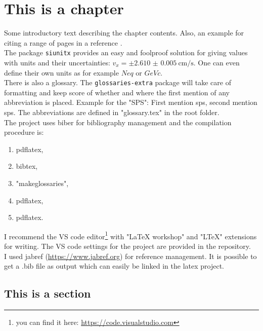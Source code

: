 \chapter{This is a chapter}
\label{ch:example}
Some introductory text describing the chapter contents. Also, an example for citing a range of pages in a reference \cite[p.~2~ff]{AguilarBenitez1988}.\\
The package \texttt{siunitx} provides an easy and foolproof solution for giving values with units and their uncertainties: $v_x = \pm\qty[per-mode=symbol]{2.610(5)}{\centi\meter\per\second}$. One can even define their own units as for example $\unit{Neq}$ or $\unit{GeVc}$.\\
There is also a glossary. The \texttt{glossaries-extra} package will take care of formatting and keep score of whether and where the first mention of any abbreviation is placed. Example for the  "SPS": First mention \gls{sps}, second mention \gls{sps}. The abbreviations are defined in "glossary.tex" in the root folder.\\
The project uses biber for bibliography management and the compilation procedure is:
\begin{enumerate}
    \item pdflatex,
    \item bibtex,
    \item "makeglossaries",
    \item pdflatex,
    \item pdflatex.
\end{enumerate}

I recommend the VS code editor\footnote{you can find it here: \href{https://code.visualstudio.com}{https://code.visualstudio.com}} with "LaTeX workshop" and "LTeX" extensions for writing. The VS code settings for the project are provided in the repository.\\
I used jabref (\href{https://www.jabref.org}{https://www.jabref.org}) for reference management. It is possible to get a .bib file as output which can easily be linked in the latex project.

\section{This is a section}
\label{sec:example}


